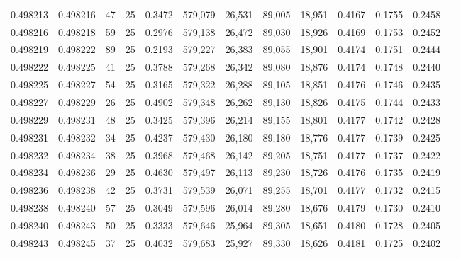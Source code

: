 \begin{tabular}{rrrrrrrrrrrrr}
0.498213 & 0.498216 &    47 &  25 &                                     0.3472 & 579,079 &  26,531 &  89,005 &  18,951 & 0.4167 & 0.1755 & 0.2458 \\
0.498216 & 0.498218 &    59 &  25 &                                     0.2976 & 579,138 &  26,472 &  89,030 &  18,926 & 0.4169 & 0.1753 & 0.2452 \\
0.498219 & 0.498222 &    89 &  25 &                                     0.2193 & 579,227 &  26,383 &  89,055 &  18,901 & 0.4174 & 0.1751 & 0.2444 \\
0.498222 & 0.498225 &    41 &  25 &                                     0.3788 & 579,268 &  26,342 &  89,080 &  18,876 & 0.4174 & 0.1748 & 0.2440 \\
0.498225 & 0.498227 &    54 &  25 &                                     0.3165 & 579,322 &  26,288 &  89,105 &  18,851 & 0.4176 & 0.1746 & 0.2435 \\
0.498227 & 0.498229 &    26 &  25 &                                     0.4902 & 579,348 &  26,262 &  89,130 &  18,826 & 0.4175 & 0.1744 & 0.2433 \\
0.498229 & 0.498231 &    48 &  25 &                                     0.3425 & 579,396 &  26,214 &  89,155 &  18,801 & 0.4177 & 0.1742 & 0.2428 \\
0.498231 & 0.498232 &    34 &  25 &                                     0.4237 & 579,430 &  26,180 &  89,180 &  18,776 & 0.4177 & 0.1739 & 0.2425 \\
0.498232 & 0.498234 &    38 &  25 &                                     0.3968 & 579,468 &  26,142 &  89,205 &  18,751 & 0.4177 & 0.1737 & 0.2422 \\
0.498234 & 0.498236 &    29 &  25 &                                     0.4630 & 579,497 &  26,113 &  89,230 &  18,726 & 0.4176 & 0.1735 & 0.2419 \\
0.498236 & 0.498238 &    42 &  25 &                                     0.3731 & 579,539 &  26,071 &  89,255 &  18,701 & 0.4177 & 0.1732 & 0.2415 \\
0.498238 & 0.498240 &    57 &  25 &                                     0.3049 & 579,596 &  26,014 &  89,280 &  18,676 & 0.4179 & 0.1730 & 0.2410 \\
0.498240 & 0.498243 &    50 &  25 &                                     0.3333 & 579,646 &  25,964 &  89,305 &  18,651 & 0.4180 & 0.1728 & 0.2405 \\
0.498243 & 0.498245 &    37 &  25 &                                     0.4032 & 579,683 &  25,927 &  89,330 &  18,626 & 0.4181 & 0.1725 & 0.2402 \\

\end{tabular}
